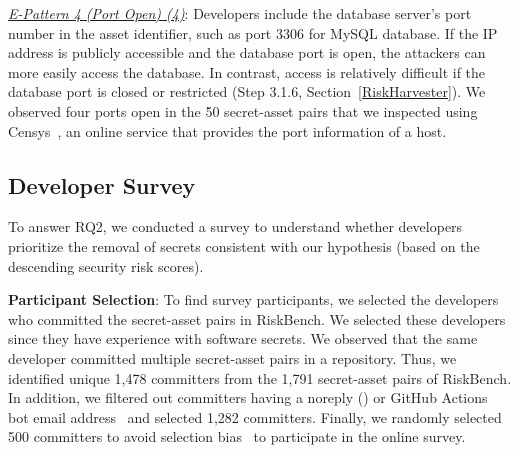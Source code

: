 \textit{\uline{E-Pattern 4 (Port Open) (4)}}: Developers include the database server's port number in the asset identifier, such as port 3306 for MySQL database. If the IP address is publicly accessible and the database port is open, the attackers can more easily access the database. In contrast, access is relatively difficult if the database port is closed or restricted (Step 3.1.6, Section~\ref{RiskHarvester}). We observed four ports open in the 50 secret-asset pairs that we inspected using Censys~\cite{censys}, an online service that provides the port information of a host.






\subsection{Developer Survey} To answer RQ2, we conducted a survey to understand whether developers prioritize the removal of secrets consistent with our hypothesis (based on the descending security risk scores).

\textbf{Participant Selection}: To find survey participants, we selected the developers who committed the secret-asset pairs in RiskBench. We selected these developers since they have experience with software secrets. We observed that the same developer committed multiple secret-asset pairs in a repository. Thus, we identified unique 1,478 committers from the 1,791 secret-asset pairs of RiskBench. In addition, we filtered out committers having a noreply () or GitHub Actions bot email address~\cite{github-no-reply} and selected 1,282 committers. Finally, we randomly selected 500 committers to avoid selection bias~\cite{selection-bias} to participate in the online survey.

